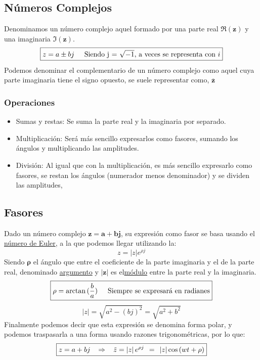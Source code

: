 \subsection{Números Complejos}
\noindent Denominamos un número complejo aquel formado por una parte real \(\mathbf{\Re(z)}\) y una imaginaria \(\mathbf{\Im(z)}\).
\[
        \boxed{ z = a\pm bj \hspace{5mm} \textnormal{Siendo j = \(\sqrt{-1}\), a veces se representa con \(i\)}}
\]
Podemos denominar el complementario de un número complejo como aquel cuya parte imaginaria tiene el signo opuesto, se suele representar como, \(\mathbf{\overline{z}}\)
\subsubsection{Operaciones}
\begin{itemize}
        \item Sumas y restas: Se suma la parte real y la imaginaria por separado.
        \item Multiplicación: Será más sencillo expresarlos como fasores, sumando los ángulos y multiplicando las amplitudes.
        \item División: Al igual que con la multiplicación, es más sencillo expresarlo como fasores, se restan los ángulos (numerador menos denominador) y se dividen las amplitudes,
\end{itemize}
\subsection{Fasores}
\noindent Dado un número complejo \(\mathbf{z = a + bj}\), su expresión como fasor se basa usando el \underline{número de Euler}, a la que podemos llegar utilizando la:
\[
        \boxed{z = \left | z \right |e^{\rho j}}
\]
\noindent Siendo \(\mathbf{\rho}\) el ángulo que entre el coeficiente de la parte imaginaria y el de la parte real, denominado \underline{argumento} y \(\mathbf{\left | z \right |}\) es el\underline{módulo} entre la parte real y la imaginaria.
\[\boxed{
                \rho = \arctan{(\frac{b}{a})} \hspace{5mm} \textnormal{Siempre se expresará en radianes}}
\]
\[
        \boxed{\left | z \right |=\sqrt{a^2 - (bj)^2} = \sqrt{a^2+ b^2}}
\]
\noindent Finalmente podemos decir que esta expresión se denomina forma polar, y podemos traspasarla a una forma usando razones trigonométricas, por lo que:
\[
        \boxed{z = a + bj \hspace{3mm} \Rightarrow \hspace{3mm}\tilde{z} = \left | z \right |e^{\rho j} \hspace{1.5mm}=\hspace{1.5mm}\left | z \right | \cos{(wt + \rho)}}
\]